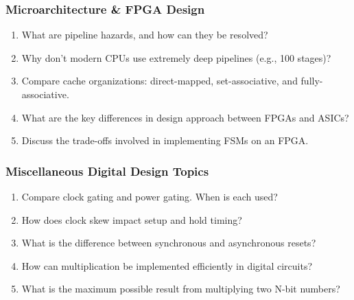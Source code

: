 \subsubsection*{Microarchitecture \& FPGA Design}
\begin{enumerate}
    \item What are pipeline hazards, and how can they be resolved?
    \item Why don't modern CPUs use extremely deep pipelines (e.g., 100 stages)?
    \item Compare cache organizations: direct-mapped, set-associative, and fully-associative.
    \item What are the key differences in design approach between FPGAs and ASICs?
    \item Discuss the trade-offs involved in implementing FSMs on an FPGA.
\end{enumerate}

\subsubsection*{Miscellaneous Digital Design Topics}
\begin{enumerate}
    \item Compare clock gating and power gating. When is each used?
    \item How does clock skew impact setup and hold timing?
    \item What is the difference between synchronous and asynchronous resets?
    \item How can multiplication be implemented efficiently in digital circuits?
    \item What is the maximum possible result from multiplying two N-bit numbers?
\end{enumerate}
